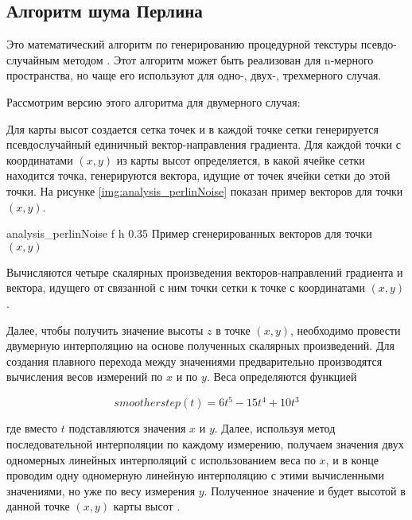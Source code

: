 \subsection{Алгоритм шума Перлина}

Это математический алгоритм по генерированию процедурной
текстуры псевдо-случайным методом \cite{info_perlinNoiseWiki}. 
Этот алгоритм может быть реализован для n-мерного пространства, но чаще его используют для одно-, двух-, трехмерного случая.

Рассмотрим версию этого алгоритма для двумерного случая:

Для карты высот создается сетка точек и в каждой точке сетки генерируется псевдослучайный единичный вектор-направления градиента. 
Для каждой точки с координатами $(x, y)$ из карты высот определяется, в какой ячейке сетки находится точка, генерируются вектора, идущие от точек ячейки сетки до этой точки.
На рисунке \ref{img:analysis_perlinNoise} показан пример векторов для точки $(x, y)$.

{analysis_perlinNoise} %
{f} %
{h} %
{0.35\textwidth} %
{Пример сгенерированных векторов для точки $(x, y)$} %

Вычисляются четыре скалярных произведения векторов-направлений
градиента и вектора, идущего от связанной с ним точки сетки к точке с
координатами $(x, y)$.

Далее, чтобы получить значение высоты $z$ в точке $(x, y)$, необходимо провести двумерную интерполяцию на основе полученных скалярных произведений. Для создания плавного перехода между значениями предварительно производятся вычисления весов измерений по $x$ и по $y$. Веса определяются функцией

\begin{equation}
	\label{equ:perlin}
	smootherstep(t) = 6t^5 - 15t^4 + 10t^3
\end{equation}
	
где вместо $t$ подставляются значения $x$ и $y$. 
Далее, используя метод последовательной интерполяции по каждому измерению, получаем значения двух одномерных линейных интерполяций с использованием веса по $x$, и в конце проводим одну одномерную линейную интерполяцию с этими вычисленными значениями, но уже по весу измерения $y$. 
Полученное значение и будет высотой в данной точке $(x, y)$ карты высот \cite{info_perlinNoise}. 

